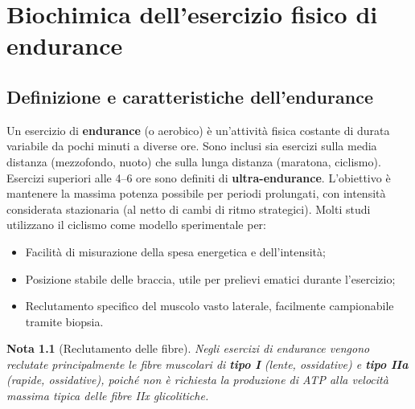 \documentclass[12pt,a4paper]{report}
\newtheorem{nota}{Nota}[section]
\begin{document}
\chapter{Biochimica dell'esercizio fisico di endurance}
\section{Definizione e caratteristiche dell'endurance}
Un esercizio di \textbf{endurance} (o aerobico) è un'attività fisica costante di durata variabile da pochi minuti a diverse ore. Sono inclusi sia esercizi sulla media distanza (mezzofondo, nuoto) che sulla lunga distanza (maratona, ciclismo). Esercizi superiori alle 4--6 ore sono definiti di \textbf{ultra-endurance}.
L'obiettivo è mantenere la massima potenza possibile per periodi prolungati, con intensità considerata stazionaria (al netto di cambi di ritmo strategici).
Molti studi utilizzano il ciclismo come modello sperimentale per:
\begin{itemize}
\item Facilità di misurazione della spesa energetica e dell'intensità;
\item Posizione stabile delle braccia, utile per prelievi ematici durante l'esercizio;
\item Reclutamento specifico del muscolo vasto laterale, facilmente campionabile tramite biopsia.
\end{itemize}
\begin{nota}[Reclutamento delle fibre]
Negli esercizi di endurance vengono reclutate principalmente le fibre muscolari di \textbf{tipo I} (lente, ossidative) e \textbf{tipo IIa} (rapide, ossidative), poiché non è richiesta la produzione di ATP alla velocità massima tipica delle fibre IIx glicolitiche.
\end{nota}
\end{document}
